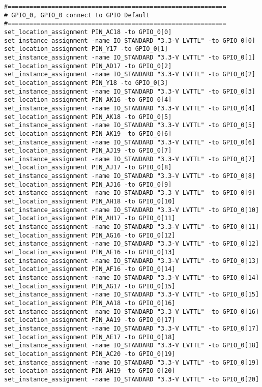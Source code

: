 \begin{verbatim}
#============================================================
# GPIO_0, GPIO_0 connect to GPIO Default
#============================================================
set_location_assignment PIN_AC18 -to GPIO_0[0]
set_instance_assignment -name IO_STANDARD "3.3-V LVTTL" -to GPIO_0[0]
set_location_assignment PIN_Y17 -to GPIO_0[1]
set_instance_assignment -name IO_STANDARD "3.3-V LVTTL" -to GPIO_0[1]
set_location_assignment PIN_AD17 -to GPIO_0[2]
set_instance_assignment -name IO_STANDARD "3.3-V LVTTL" -to GPIO_0[2]
set_location_assignment PIN_Y18 -to GPIO_0[3]
set_instance_assignment -name IO_STANDARD "3.3-V LVTTL" -to GPIO_0[3]
set_location_assignment PIN_AK16 -to GPIO_0[4]
set_instance_assignment -name IO_STANDARD "3.3-V LVTTL" -to GPIO_0[4]
set_location_assignment PIN_AK18 -to GPIO_0[5]
set_instance_assignment -name IO_STANDARD "3.3-V LVTTL" -to GPIO_0[5]
set_location_assignment PIN_AK19 -to GPIO_0[6]
set_instance_assignment -name IO_STANDARD "3.3-V LVTTL" -to GPIO_0[6]
set_location_assignment PIN_AJ19 -to GPIO_0[7]
set_instance_assignment -name IO_STANDARD "3.3-V LVTTL" -to GPIO_0[7]
set_location_assignment PIN_AJ17 -to GPIO_0[8]
set_instance_assignment -name IO_STANDARD "3.3-V LVTTL" -to GPIO_0[8]
set_location_assignment PIN_AJ16 -to GPIO_0[9]
set_instance_assignment -name IO_STANDARD "3.3-V LVTTL" -to GPIO_0[9]
set_location_assignment PIN_AH18 -to GPIO_0[10]
set_instance_assignment -name IO_STANDARD "3.3-V LVTTL" -to GPIO_0[10]
set_location_assignment PIN_AH17 -to GPIO_0[11]
set_instance_assignment -name IO_STANDARD "3.3-V LVTTL" -to GPIO_0[11]
set_location_assignment PIN_AG16 -to GPIO_0[12]
set_instance_assignment -name IO_STANDARD "3.3-V LVTTL" -to GPIO_0[12]
set_location_assignment PIN_AE16 -to GPIO_0[13]
set_instance_assignment -name IO_STANDARD "3.3-V LVTTL" -to GPIO_0[13]
set_location_assignment PIN_AF16 -to GPIO_0[14]
set_instance_assignment -name IO_STANDARD "3.3-V LVTTL" -to GPIO_0[14]
set_location_assignment PIN_AG17 -to GPIO_0[15]
set_instance_assignment -name IO_STANDARD "3.3-V LVTTL" -to GPIO_0[15]
set_location_assignment PIN_AA18 -to GPIO_0[16]
set_instance_assignment -name IO_STANDARD "3.3-V LVTTL" -to GPIO_0[16]
set_location_assignment PIN_AA19 -to GPIO_0[17]
set_instance_assignment -name IO_STANDARD "3.3-V LVTTL" -to GPIO_0[17]
set_location_assignment PIN_AE17 -to GPIO_0[18]
set_instance_assignment -name IO_STANDARD "3.3-V LVTTL" -to GPIO_0[18]
set_location_assignment PIN_AC20 -to GPIO_0[19]
set_instance_assignment -name IO_STANDARD "3.3-V LVTTL" -to GPIO_0[19]
set_location_assignment PIN_AH19 -to GPIO_0[20]
set_instance_assignment -name IO_STANDARD "3.3-V LVTTL" -to GPIO_0[20]

\end{verbatim}
